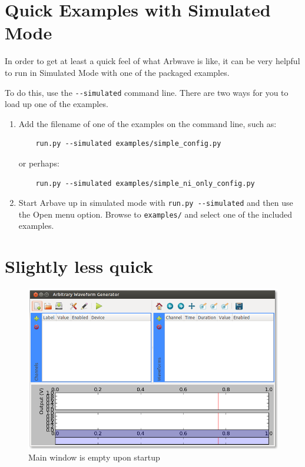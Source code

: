 \thispagestyle{fancy}
\pagestyle{fancy}

\section{Quick Examples with Simulated Mode}

In order to get at least a quick feel of what Arbwave is like, it can be very
helpful to run in Simulated Mode with one of the packaged examples.

To do this, use the \verb|--simulated| command line.  There are two ways for you
to load up one of the examples.
\begin{enumerate}
  \item Add the filename of one of the examples on the command line, such as:\\
    \begin{verbatim}
    run.py --simulated examples/simple_config.py
    \end{verbatim}
    or perhaps:
    \begin{verbatim}
    run.py --simulated examples/simple_ni_only_config.py
    \end{verbatim}
  \item Start Arbave up in simulated mode with \verb|run.py --simulated| and
  then use the Open menu option.  Browse to \verb|examples/| and select one of
  the included examples.
\end{enumerate}



\section{Slightly less quick}
\begin{figure}[hb]
  \centerline{\includegraphics[width=\textwidth]{figures/main-empty}}
  \caption{Main window is empty upon startup}
  \label{fig:quick:main-empty}
\end{figure}



